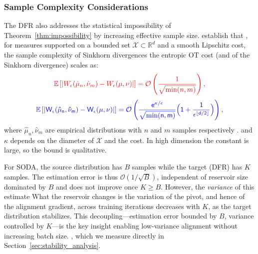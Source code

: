 \documentclass[preprint,12pt]{elsarticle}
\providecommand{\DIFadd}[1]{{\protect\color{blue} \sf #1}} %
\providecommand{\DIFdel}[1]{{\protect\color{red} \scriptsize #1}} %
\providecommand{\DIFaddbegin}{} %
\providecommand{\DIFaddend}{} %
\providecommand{\DIFdelbegin}{} %
\providecommand{\DIFdelend}{} %
\newcommand{\DIFscaledelfig}{0.5}
\newlength{\DIFdelgraphicswidth} %
\newlength{\DIFdelgraphicsheight} %
\newcommand{\DIFaddincludegraphics}[2][]{{\color{blue}\fbox{\DIFOincludegraphics[#1]{#2}}}} %
\newcommand{\DIFdelincludegraphics}[2][]{%
\sbox{\DIFdelgraphicsbox}{\DIFOincludegraphics[#1]{#2}}%
\settoboxwidth{\DIFdelgraphicswidth}{\DIFdelgraphicsbox} %
\settoboxtotalheight{\DIFdelgraphicsheight}{\DIFdelgraphicsbox} %
\scalebox{\DIFscaledelfig}{%
\parbox[b]{\DIFdelgraphicswidth}{\usebox{\DIFdelgraphicsbox}\\[-\baselineskip] \rule{\DIFdelgraphicswidth}{0em}}\llap{\resizebox{\DIFdelgraphicswidth}{\DIFdelgraphicsheight}{%
\setlength{\unitlength}{\DIFdelgraphicswidth}%
\begin{picture}(1,1)%
\thicklines\linethickness{2pt} %
{\color[rgb]{1,0,0}\put(0,0){\framebox(1,1){}}}%
{\color[rgb]{1,0,0}\put(0,0){\line( 1,1){1}}}%
{\color[rgb]{1,0,0}\put(0,1){\line(1,-1){1}}}%
\end{picture}%
}\hspace*{3pt}}} %
} %
\DeclareRobustCommand{\DIFaddbegin}{\DIFOaddbegin \let\includegraphics\DIFaddincludegraphics} %
\DeclareRobustCommand{\DIFaddend}{\DIFOaddend \let\includegraphics\DIFOincludegraphics} %
\DeclareRobustCommand{\DIFdelbegin}{\DIFOdelbegin \let\includegraphics\DIFdelincludegraphics} %
\DeclareRobustCommand{\DIFdelend}{\DIFOaddend \let\includegraphics\DIFOincludegraphics} %
\begin{document}
\subsubsection{Sample Complexity Considerations}

The DFR also addresses the statistical impossibility of Theorem~\ref{thm:impossibility} by increasing effective sample size. \citet{genevay2019sample} establish that\DIFaddbegin \DIFadd{, for measures supported on a bounded set $\mathcal X\subset\mathbb R^d$ and a smooth Lipschitz cost, }\DIFaddend the sample complexity of \DIFdelbegin \DIFdel{Sinkhorn divergences }\DIFdelend \DIFaddbegin \DIFadd{the entropic OT cost (and of the Sinkhorn divergence) }\DIFaddend scales as:
\DIFdelbegin \begin{displaymath}
    \DIFdel{\mathbb{E}\left[|W_\epsilon(\hat{\mu}_n, \hat{\nu}_m) - W_\epsilon(\mu, \nu)|\right] = \mathcal{O}\left(\frac{1}{\sqrt{\min(n,m)}}\right),
}\end{displaymath}%
\DIFdelend \DIFaddbegin \begin{equation}
    \DIFadd{\mathbb{E}\left[|W_\epsilon(\hat{\mu}_n, \hat{\nu}_m) - W_\epsilon(\mu, \nu)|\right] = \mathcal{O}\left(\frac{e^{\kappa/\epsilon}}{\sqrt{\min(n,m)}}\Big(1+\frac{1}{\epsilon^{\lfloor d/2\rfloor}}\Big)\right),
}\end{equation}\DIFaddend 
where $\hat{\mu}_n, \hat{\nu}_m$ are empirical distributions with $n$ and $m$ samples respectively \DIFdelbegin \DIFdel{.
}\DIFdelend \DIFaddbegin \DIFadd{and $\kappa$ depends on the diameter of $\mathcal X$ and the cost. In high dimension the constant is large, so the bound is qualitative.
}\DIFaddend 

For SODA, the source distribution has $B$ samples while the target (DFR) has $K$ samples. The estimation error is thus \DIFdelbegin \DIFdel{$\mathcal{O}(1/\sqrt{B})$, independent of reservoir size }\DIFdelend \DIFaddbegin \DIFadd{dominated by $B$ and does not improve }\DIFaddend once $K \geq B$. \DIFdelbegin \DIFdel{However, the \textit{variance} of this estimate }\DIFdelend \DIFaddbegin \DIFadd{What the reservoir changes is the variation of the pivot, and hence of the alignment gradient, }\DIFaddend across training iterations\DIFdelbegin \DIFdel{decreases with $K$, as the target distribution stabilizes.
This decoupling—estimation error bounded by $B$, variance controlled by $K$—is the key insight enabling low-variance alignment without increasing batch size.
}\DIFdelend \DIFaddbegin \DIFadd{, which we measure directly in Section~\ref{sec:stability_analysis}.
}\DIFaddend 
\end{document}
